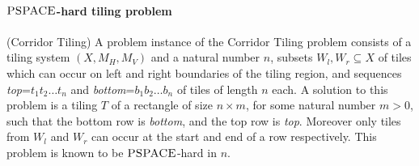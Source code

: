 \documentclass{llncs}
\newcommand{\class}{\textsc}
\newcommand{\pspace}{\mbox{$\class{PSPACE}$}}
\begin{document}
\paragraph{\pspace-hard tiling problem} (Corridor Tiling) A problem instance of the Corridor Tiling problem consists of a tiling system $(X,M_H,M_V)$ and a natural number $n$, subsets $W_l, W_r \subseteq X$ of tiles which can occur on left and right boundaries of the tiling region, and sequences \textit{top}=$t_1t_2 \ldots t_n$ and \textit{bottom}=$b_1b_2 \ldots b_n$ of tiles of length $n$ each. A solution to this problem is a tiling $T$ of a rectangle of size $n\times m$, for some natural number $m>0$, such that the bottom row is \textit{bottom}, and the top row is \textit{top}. Moreover only tiles from $W_l$ and $W_r$ can occur at the start and end of a row respectively. This problem is known to be \pspace-hard in $n$.
\end{document}

